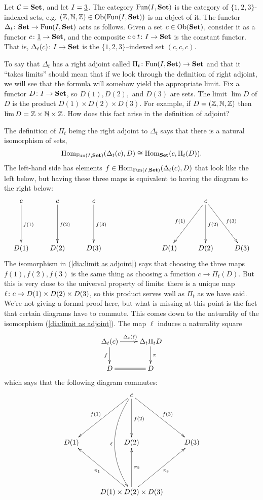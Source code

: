 \documentclass[CT4S-EN-RU]{subfiles}
\begin{document}
\begin{example}

Let $\mathcal{C}={\bf Set}$, and let $I=\underline{3}$. The category $\textnormal{Fun}(I,{\bf Set})$ is the category of $\{1,2,3\}$-indexed sets, e.g. $({\mathbb Z},{\mathbb N},{\mathbb Z})\in\textnormal{Ob}(\textnormal{Fun}(I,{\bf Set}))$ is an object of it. The functor $\Delta_t\colon{\bf Set}\rightarrow\textnormal{Fun}(I,{\bf Set})$ acts as follows. Given a set $c\in\textnormal{Ob}({\bf Set})$, consider it as a functor $c\colon\underline{1}\rightarrow{\bf Set}$, and the composite $c\circ t\colon I\rightarrow{\bf Set}$ is the constant functor. That is, $\Delta_t(c)\colon I\rightarrow{\bf Set}$ is the $\{1,2,3\}$--indexed set $(c,c,c)$.

To say that $\Delta_t$ has a right adjoint called $\Pi_t\colon\textnormal{Fun}(I,{\bf Set})\rightarrow{\bf Set}$ and that it “takes limits” should mean that if we look through the definition of right adjoint, we will see that the formula will somehow yield the appropriate limit. Fix a functor $D\colon I\rightarrow{\bf Set}$, so $D(1),D(2),$ and $D(3)$ are sets. The limit $\lim D$ of $D$ is the product $D(1)\times D(2)\times D(3)$. For example, if $D=({\mathbb Z},{\mathbb N},{\mathbb Z})$ then $\lim D={\mathbb Z}\times{\mathbb N}\times{\mathbb Z}$. How does this fact arise in the definition of adjoint?

The definition of $\Pi_t$ being the right adjoint to $\Delta_t$ says that there is a natural isomorphism of sets, 
\begin{align}\label{dia:limit as adjoint}
\textnormal{Hom}_{\textnormal{Fun}(I,{\bf Set})}(\Delta_t(c),D)\cong\textnormal{Hom}_{\bf Set}(c,\Pi_t(D)).
\end{align}
The left-hand side has elements $f\in\textnormal{Hom}_{\textnormal{Fun}(I,{\bf Set})}(\Delta_t(c),D)$ that look like the left below, but having these three maps is equivalent to having the diagram to the right below:
$$\xymatrix{
c\ar[dd]^{f(1)}&c\ar[dd]^{f(2)}&c\ar[dd]^{f(3)}\\\\
D(1)&D(2)&D(3)
}
\hspace{1in}
\xymatrix{
&c\ar[ddl]_{f(1)}\ar[dd]^{f(2)}\ar[ddr]^{f(3)}\\\\
D(1)&D(2)&D(3)
}$$
The isomorphism in (\ref{dia:limit as adjoint}) says that choosing the three maps $f(1),f(2),f(3)$ is the same thing as choosing a function $c\to\Pi_t(D)$. But this is very close to the universal property of limits: there is a unique map $\ell\colon c\rightarrow D(1)\times D(2)\times D(3)$, so this product serves well as $\Pi_t$ as we have said. We're not giving a formal proof here, but what is missing at this point is the fact that certain diagrams have to commute. This comes down to the naturality of the isomorphism (\ref{dia:limit as adjoint}). The map $\ell$ induces a naturality square
$$\xymatrix{\Delta_t(c)\ar[r]^{\Delta_t(\ell)}\ar[d]_f&\Delta_t\Pi_tD\ar[d]^\pi\\D\ar@{=}[r]&D}$$
which says that the following diagram commutes:
$$\xymatrix{&c\ar[ddl]_{f(1)}\ar[dd]^{f(2)}\ar[ddr]^{f(3)}\ar@/_2pc/[dddd]_\ell\\\\
D(1)&D(2)&D(3)\\\\
&D(1)\times D(2)\times D(3)\ar[uul]^{\pi_1}\ar[uu]_{\pi_2}\ar[uur]_{\pi_3}
}$$

\end{example}
\end{document}
